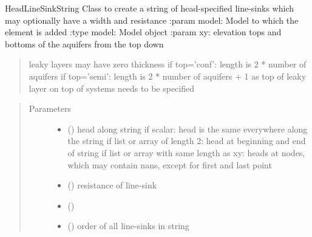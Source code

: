 \documentclass[letterpaper,10pt,english]{sphinxmanual}
\begin{document}
\begin{fulllineitems}
\label{\detokenize{linesinks/headlinesinkstring:timml.linesink.HeadLineSinkString}}
HeadLineSinkString Class to create a string of head-specified line-sinks
which may optionally have a width and resistance
:param model: Model to which the element is added
:type model: Model object
:param xy: elevation tops and bottoms of the aquifers from the top down
\begin{quote}

leaky layers may have zero thickness
if top=’conf’: length is 2 * number of aquifers
if top=’semi’: length is 2 * number of aquifers + 1 as top
of leaky layer on top of systems needs to be specified
\end{quote}
\begin{quote}\begin{description}
\item[{Parameters}] \leavevmode\begin{itemize}
\item {} 
 (\sphinxstyleliteralemphasis{, }) \textendash{} head along string
if scalar: head is the same everywhere along the string
if list or array of length 2: head at beginning and end of string
if list or array with same length as xy: heads at nodes, which
may contain nans, except for first and last point

\item {} 
 (\sphinxstyleliteralemphasis{ (}\sphinxstyleliteralemphasis{)}) \textendash{} resistance of line-sink

\item {} 
 () \textendash{} 

\item {} 
 (\sphinxstyleliteralemphasis{ (}\sphinxstyleliteralemphasis{)}) \textendash{} order of all line-sinks in string


\end{itemize}
\end{description}
\end{quote}
\end{fulllineitems}
\end{document}
